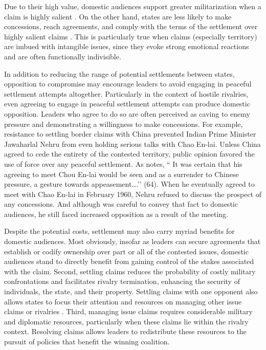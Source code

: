 Due to their high value, domestic audiences support greater militarization when a claim is highly salient \citep{hensel2001, hensel2008, huth2009, mansbach1981, vasquez2009}. On the other hand, states are less likely to make concessions, reach agreements, and comply with the terms of the settlement over highly salient claims \citep{allee2006, mitchell2007, simmons2002, vasquez2009}. This is particularly true when claims (especially territory) are imbued with intangible issues, since they evoke strong emotional reactions and are often functionally indivisible.


In addition to reducing the range of potential settlements between states, opposition to compromise may encourage leaders to avoid engaging in peaceful settlement attempts altogether. Particularly in the context of hostile rivalries, even agreeing to engage in peaceful settlement attempts can produce domestic opposition. Leaders who agree to do so are often perceived as caving to enemy pressure and demonstrating a willingness to make concessions. For example, resistance to settling border claims with China prevented Indian Prime Minister Jawaharlal Nehru from even holding serious talks with Chao En-lai. Unless China agreed to cede the entirety of the contested territory, public opinion favored the use of force over any peaceful settlement. As \citet{maxwell1970} notes, `` It was certain that his agreeing to meet Chou En-lai would be seen and as a surrender to Chinese pressure, a gesture towards appeasement….’’ (64). When he eventually agreed to meet with Chao En-lai in February 1960, Nehru refused to discuss the prospect of any concessions. And although was careful to convey that fact to domestic audiences, he still faced increased opposition as a result of the meeting. 


Despite the potential costs, settlement may also carry myriad benefits for domestic audiences. Most obviously, insofar as leaders can secure agreements that establish or codify ownership over part or all of the contested issues, domestic audiences stand to directly benefit from gaining control of the stakes associated with the claim. Second, settling claims reduces the probability of costly military confrontations and facilitates rivalry termination, enhancing the security of individuals, the state, and their property. Settling claims with one opponent also allows states to focus their attention and resources on managing other issue claims or rivalries \citep{akcinaroglu2014, fravel2008}. Third, managing issue claims requires considerable military and diplomatic resources, particularly when these claims lie within the rivalry context. Resolving claims allows leaders to redistribute these resources to the pursuit of policies that benefit the winning coalition. 

